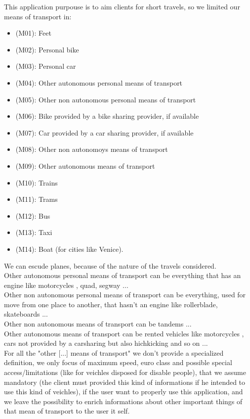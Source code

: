 \documentclass[a4paper]{book}
\begin{document}
This application purpouse is to aim clients for short travels, so we limited our means of transport in:

\begin{itemize}

\item (M01): Feet 
\item (M02): Personal bike 
\item (M03): Personal car
\item (M04): Other autonomous personal means of transport
\item (M05): Other non autonomous personal means of transport
\item (M06): Bike provided by a bike sharing provider, if available
\item (M07): Car provided by a car sharing provider, if available
\item (M08): Other non autonomoys means of transport
\item (M09): Other autonomous means of transport
\item (M10): Trains
\item (M11): Trams
\item (M12): Bus 
\item (M13): Taxi
\item (M14): Boat (for cities like Venice).

\end{itemize}

We can escude planes, because of the nature of the travels considered.\\

Other autonomous personal means of transport can be everything that has an engine like motorcycles , quad, segway ...\\

Other non autonomous personal means of transport can be everything, used for move from one place to another, that hasn't an engine like rollerblade, skateboards ...\\

Other non autonomous means of transport can be tandems ... \\

Other autonomous means of transport can be rented vehicles like motorcycles , cars not provided by a carsharing but also hichkicking and so on ... \\

For all the "other [...] means of transport" we don't provide a specialized definition, we only focus of maximum speed, euro class and possible special access/limitations (like for veichles disposed for disable people), that we assume mandatory (the client must provided this kind of informations if he intended to use this kind of veichles), if the user want to properly use this application, and we leave the possibility to enrich informations about other important things of that mean of transport to the user it self.\\ 
\end{document}
